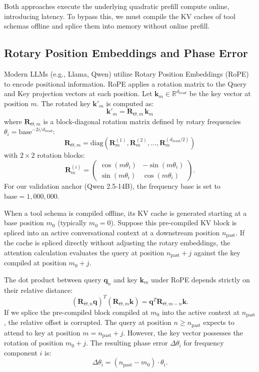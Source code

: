 Both approaches execute the underlying quadratic prefill compute online, introducing latency. To bypass this, we must compile the KV caches of tool schemas offline and splice them into memory without online prefill.

\subsection{Rotary Position Embeddings and Phase Error}
Modern LLMs (e.g., Llama, Qwen) utilize Rotary Position Embeddings (RoPE)~\cite{peng2023yarn} to encode positional information. RoPE applies a rotation matrix to the Query and Key projection vectors at each position. Let $\mathbf{k}_m \in \mathbb{R}^{d_{head}}$ be the key vector at position $m$. The rotated key $\mathbf{k}'_m$ is computed as:
\begin{equation}
\mathbf{k}'_m = \mathbf{R}_{\Theta, m} \, \mathbf{k}_m
\end{equation}
where $\mathbf{R}_{\Theta, m}$ is a block-diagonal rotation matrix defined by rotary frequencies $\theta_i = \text{base}^{-2i/d_{head}}$:
\begin{equation}
\mathbf{R}_{\Theta, m} = \text{diag}\left( \mathbf{R}_m^{(1)}, \mathbf{R}_m^{(2)}, \dots, \mathbf{R}_m^{(d_{head}/2)} \right)
\end{equation}
with $2 \times 2$ rotation blocks:
\begin{equation}
\mathbf{R}_m^{(i)} = \begin{pmatrix} \cos(m \theta_i) & -\sin(m \theta_i) \\ \sin(m \theta_i) & \cos(m \theta_i) \end{pmatrix}.
\end{equation}
For our validation anchor (Qwen 2.5-14B), the frequency base is set to $\text{base} = 1,000,000$.

When a tool schema is compiled offline, its KV cache is generated starting at a base position $m_0$ (typically $m_0 = 0$). Suppose this pre-compiled KV block is spliced into an active conversational context at a downstream position $n_{\text{past}}$. If the cache is spliced directly without adjusting the rotary embeddings, the attention calculation evaluates the query at position $n_{\text{past}} + j$ against the key compiled at position $m_0 + j$.

The dot product between query $\mathbf{q}_n$ and key $\mathbf{k}_m$ under RoPE depends strictly on their relative distance:
\begin{equation}
(\mathbf{R}_{\Theta, n} \mathbf{q})^T (\mathbf{R}_{\Theta, m} \mathbf{k}) = \mathbf{q}^T \mathbf{R}_{\Theta, m - n} \mathbf{k}.
\end{equation}
If we splice the pre-compiled block compiled at $m_0$ into the active context at $n_{\text{past}}$, the relative offset is corrupted. The query at position $n \ge n_{\text{past}}$ expects to attend to key at position $m = n_{\text{past}} + j$. However, the key vector possesses the rotation of position $m_0 + j$. The resulting phase error $\Delta \theta_i$ for frequency component $i$ is:
\begin{equation}
\Delta \theta_i = (n_{\text{past}} - m_0) \cdot \theta_i.
\end{equation}

